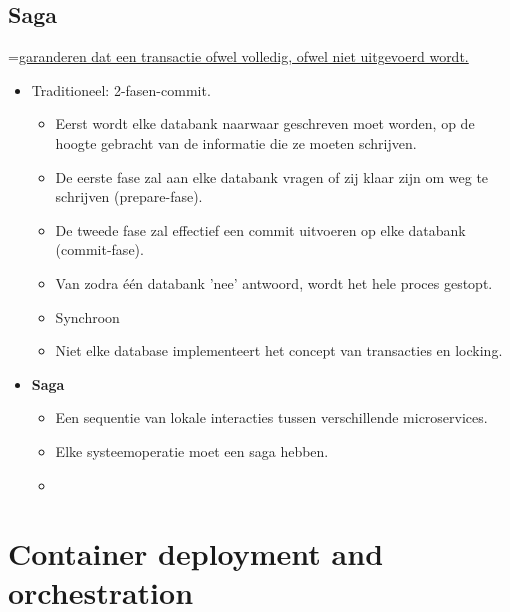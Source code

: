 \documentclass{report}
\begin{document}
	\chapter{Saga}
	=\underline{garanderen dat een transactie ofwel volledig, ofwel niet uitgevoerd wordt.}
	\begin{itemize}
		\item[\info] Traditioneel: 2-fasen-commit.
		\begin{itemize}
			\item[\info] Eerst wordt elke databank naarwaar geschreven moet worden, op de hoogte gebracht van de informatie die ze moeten schrijven.
			\item[\info] De eerste fase zal aan elke databank vragen of zij klaar zijn om weg te schrijven (prepare-fase).
			\item[\info] De tweede fase zal effectief een commit uitvoeren op elke databank (commit-fase).
			\item[\info] Van zodra één databank 'nee' antwoord, wordt het hele proces gestopt.
			\item[\alert] Synchroon
			\item[\alert] Niet elke database implementeert het concept van transacties en locking.
		\end{itemize}
		\item[\info] \textbf{Saga}
		\begin{itemize}
			\item[\info] Een sequentie van lokale interacties tussen verschillende microservices.
			\item[\info] Elke systeemoperatie moet een saga hebben.
			\item[\info] 
		\end{itemize}
	\end{itemize}
	
	\part{Container deployment and orchestration}
\end{document}
